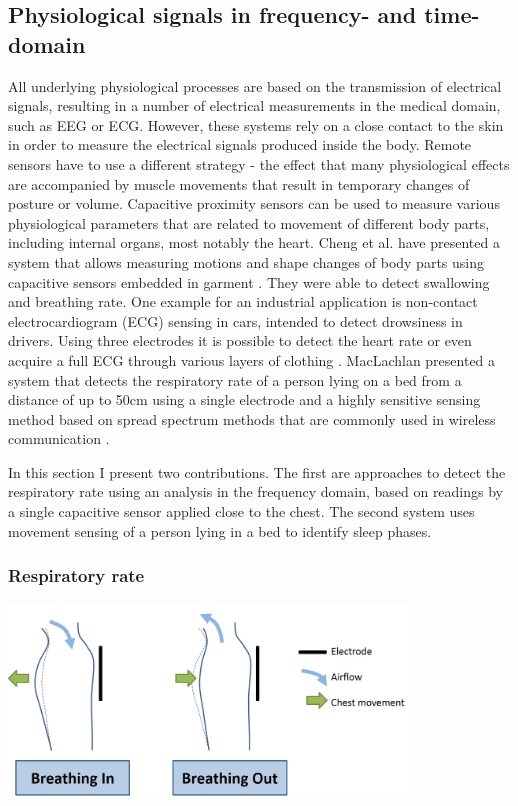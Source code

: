 \subsection{Physiological signals in frequency- and time-domain}
\label{ch:proc_physio}
All underlying physiological processes are based on the transmission of electrical signals, resulting in a number of electrical measurements in the medical domain, such as EEG or ECG. However, these systems rely on a close contact to the skin in order to measure the electrical signals produced inside the body. Remote sensors have to use a different strategy - the effect that many physiological effects are accompanied by muscle movements that result in temporary changes of posture or volume. Capacitive proximity sensors can be used to measure various physiological parameters that are related to movement of different body parts, including internal organs, most notably the heart. Cheng et al. have presented a system that allows measuring motions and shape changes of body parts using capacitive sensors embedded in garment \cite{cheng2010active}. They were able to detect swallowing and breathing rate. One example for an industrial application is non-contact electrocardiogram (ECG) sensing in cars, intended to detect drowsiness in drivers. Using three electrodes it is possible to detect the heart rate or even acquire a full ECG through various layers of clothing \cite{plessey2012ecg}. MacLachlan presented a system that detects the respiratory rate of a person lying on a bed from a distance of up to 50cm using a single electrode and a highly sensitive sensing method based on spread spectrum methods that are commonly used in wireless communication \cite{MacLachlan2004}.

In this section I present two contributions. The first are approaches to detect the respiratory rate using an analysis in the frequency domain, based on readings by a single capacitive sensor applied close to the chest. The second system uses movement sensing of a person lying in a bed to identify sleep phases.

\subsubsection{Respiratory rate}
\begin{minipage}{\linewidth}
\centering
\includegraphics[width=0.8\textwidth]{images/breathing}
\label{fig:breathing}
\end{minipage}


